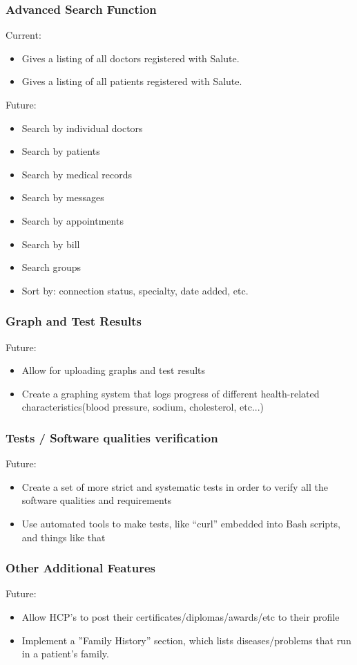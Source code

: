 \subsubsection{Advanced Search Function}
Current:
\begin{itemize}
\item Gives a listing of all doctors registered with Salute.
\item Gives a listing of all patients registered with Salute.
\end{itemize}
Future: 
\begin{itemize}
\item Search by individual doctors 
\item Search by patients
\item Search by medical records 
\item Search by messages
\item Search by appointments
\item Search by bill
\item Search groups
\item Sort by: connection status, specialty, date added, etc.
\end{itemize}

\subsubsection{Graph and Test Results}
Future: 
\begin{itemize}
\item Allow for uploading graphs and test results
\item Create a graphing system that logs progress of different health-related characteristics(blood pressure, sodium, cholesterol, etc...)
\end{itemize}

\subsubsection{Tests / Software qualities verification}
Future:
\begin{itemize}
\item Create a set of more strict and systematic tests in order to verify all the software qualities and requirements
\item Use automated tools to make tests, like ``curl'' embedded into Bash scripts, and things like that
\end{itemize}

\subsubsection{Other Additional Features}
Future:
\begin{itemize}
\item Allow HCP's to post their certificates/diplomas/awards/etc to their profile
\item Implement a ''Family History'' section, which lists diseases/problems that run in a patient's family. 
\end{itemize}

